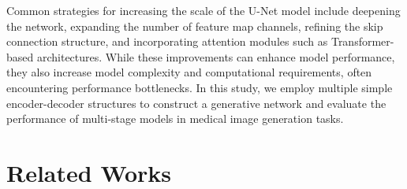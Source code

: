 \documentclass[twocolumn]{article}
\begin{document}
Common strategies for increasing the scale of the U-Net model include deepening the network, expanding the number of feature map channels, refining the skip connection structure, and incorporating attention modules such as Transformer-based architectures. While these improvements can enhance model performance, they also increase model complexity and computational requirements, often encountering performance bottlenecks. In this study, we employ multiple simple encoder-decoder structures to construct a generative network and evaluate the performance of multi-stage models in medical image generation tasks.

\section{Related Works}

\end{document}
